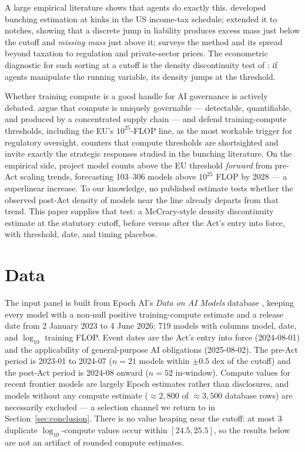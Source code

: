 \documentclass[11pt]{article}
\begin{document}
A large empirical literature shows that agents do exactly this.
\cite{saez2010} developed bunching estimation at kinks in the US income-tax
schedule; \cite{klevenwaseem2013} extended it to notches, showing that a
discrete jump in liability produces excess mass just below the cutoff and
\emph{missing mass} just above it; \cite{kleven2016} surveys the method and
its spread beyond taxation to regulation and private-sector prices. The
econometric diagnostic for such sorting at a cutoff is the density
discontinuity test of \cite{mccrary2008}: if agents manipulate the running
variable, its density jumps at the threshold.

Whether training compute is a good handle for AI governance is actively
debated. \cite{sastry2024} argue that compute is uniquely governable ---
detectable, quantifiable, and produced by a concentrated supply chain ---
and \cite{heimkoessler2024} defend training-compute thresholds, including the
EU's $10^{25}$-FLOP line, as the most workable trigger for regulatory
oversight. \cite{hooker2024} counters that compute thresholds are shortsighted
and invite exactly the strategic responses studied in the bunching
literature. On the empirical side, \cite{kumarmanning2025} project model
counts above the EU threshold \emph{forward} from pre-Act scaling trends,
forecasting 103--306 models above $10^{25}$ FLOP by 2028 --- a superlinear
increase. To our knowledge, no published estimate tests whether the observed
post-Act density of models near the line already departs from that trend.
This paper supplies that test: a McCrary-style density discontinuity estimate
at the statutory cutoff, before versus after the Act's entry into force, with
threshold, date, and timing placebos.

\section{Data}\label{sec:data}

The input panel is built from Epoch AI's \emph{Data on AI Models} database
\cite{epochai}, keeping every model with a non-null positive training-compute
estimate and a release date from 2 January 2023 to 4 June 2026: 719 models
with columns model, date, and $\log_{10}$ training FLOP. Event dates are the
Act's entry into force (2024-08-01) and the applicability of general-purpose
AI obligations (2025-08-02). The pre-Act period is 2023-01 to 2024-07
($n=21$ models within $\pm 0.5$ dex of the cutoff) and the post-Act period is
2024-08 onward ($n=52$ in-window). Compute values for recent frontier models
are largely Epoch estimates rather than disclosures, and models without any
compute estimate ($\approx 2{,}800$ of $\approx 3{,}500$ database rows) are
necessarily excluded --- a selection channel we return to in
Section~\ref{sec:conclusion}. There is no value heaping near the cutoff: at
most 3 duplicate $\log_{10}$-compute values occur within $[24.5, 25.5]$, so
the results below are not an artifact of rounded compute estimates.
\end{document}
